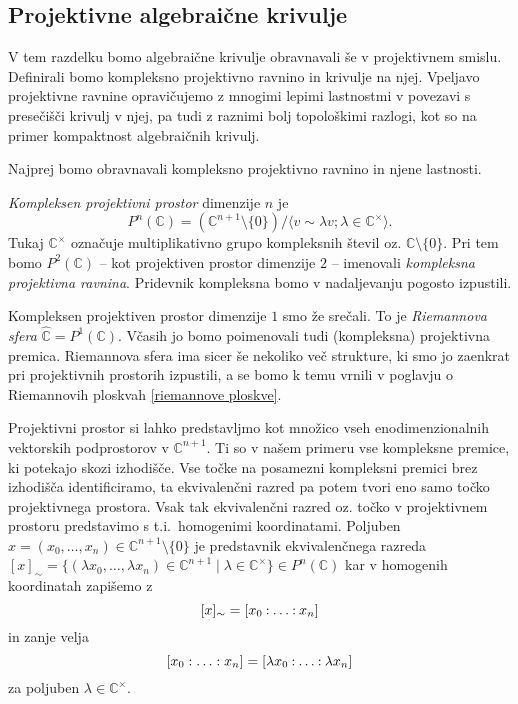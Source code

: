 \documentclass[mat1]{fmfdelo}
\newcommand{\C}{\mathbb C}
\newcommand{\CM}{\mathbb C ^\times}
\newcommand{\PC}{P^2(\mathbb C)}
\newcommand{\pcoor}[1]{%
\begingroup\lccode`~=`: \lowercase{\endgroup
\edef~}{\mathbin{\mathchar\the\mathcode`:}\nobreak}%
\left[%
\begingroup
\mathcode`:=\string"8000
#1%
\endgroup
\right]%
}
\theoremstyle{definition}
\begin{document}
 

\subsection{Projektivne algebraične krivulje}

V tem razdelku bomo algebraične krivulje obravnavali še v projektivnem smislu. Definirali bomo kompleksno projektivno ravnino in krivulje na njej. Vpeljavo projektivne ravnine opravičujemo z mnogimi lepimi lastnostmi v povezavi s presečišči krivulj v njej, pa tudi z raznimi bolj topološkimi razlogi, kot so na primer kompaktnost algebraičnih krivulj.

Najprej bomo obravnavali kompleksno projektivno ravnino in njene lastnosti. 
\begin{definicija}
    \emph{Kompleksen projektivni prostor} dimenzije $n$ je 
    \[
        P^n(\C) = (\C^{n+1} \setminus \{0 \}) / \langle v \sim \lambda v; \lambda \in \C^{\times} \rangle.
    \]
    Tukaj $\C^{\times}$ označuje multiplikativno grupo kompleksnih števil oz. $\C \setminus \{0 \}$. 
    Pri tem bomo $\PC$ -- kot projektiven prostor dimenzije $2$ -- imenovali \emph{kompleksna projektivna ravnina}. Pridevnik kompleksna bomo v nadaljevanju pogosto izpustili.
\end{definicija}

\begin{primer*}
    Kompleksen projektiven prostor dimenzije $1$ smo že srečali. To je \emph{Riemannova sfera} $\widehat{\C} = P^1(\C)$. Včasih jo bomo poimenovali tudi (kompleksna) projektivna premica. Riemannova sfera ima sicer še nekoliko več strukture, ki smo jo zaenkrat pri projektivnih prostorih izpustili, a se bomo k temu vrnili v poglavju o Riemannovih ploskvah \ref{riemannove ploskve}.
\end{primer*}

Projektivni prostor si lahko predstavljmo kot množico vseh enodimenzionalnih vektorskih podprostorov v $\C^{n+1}$. Ti so v našem primeru vse kompleksne premice, ki potekajo skozi izhodišče. Vse točke na posamezni kompleksni premici brez izhodišča identificiramo, ta ekvivalenčni razred pa potem tvori eno samo točko projektivnega prostora. Vsak tak ekvivalenčni razred oz. točko v projektivnem prostoru predstavimo s t.i.\ homogenimi koordinatami. Poljuben $x = (x_0, \dots, x_n) \in \C^{n+1}\setminus \{0\}$ je predstavnik ekvivalenčnega razreda $[x]_\sim = \{(\lambda x_0, \dots, \lambda x_n) \in \C^{n+1} \mid \lambda \in \CM\} \in P^n(\C)$ kar v homogenih koordinatah zapišemo z
    \[
        [x]_\sim = \pcoor{x_0 : \ldots : x_n}
    \]
in zanje velja
    \[
        [x_0: \ldots: x_n] = \pcoor{\lambda x_0: \ldots: \lambda x_n}
    \]
za poljuben $\lambda \in \CM$.
\end{document}
